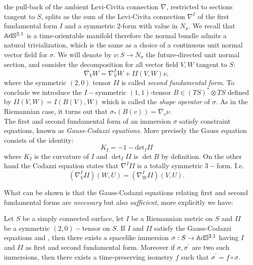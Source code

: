 the pull-back of the ambient Levi-Civita connection $\nabla$, restricted to sections tangent to $S$, splits as the sum of the Levi-Civita connection $\nabla^I$ of the first fundamental form $I$ and a symmetric 2-form with value in $N_\sigma$. We recall that $\mathbb{A}\mathrm{d}\mathbb{S}^{2,1}$ is a time-orientable manifold therefore the normal bundle admits a natural trivialization, which is the same as a choice of a continuous unit normal vector field for $\sigma.$ We will denote by $\nu:S\to N_\sigma$ the future-directed unit normal section, and consider the decomposition for all vector field $V,W$ tangent to $S$: 
\[
    \nabla_V W=\nabla^I_V W+II(V,W)\nu,
\]
where the symmetric $(2,0)$ tensor $II$ is called \textit{second fundamental form}. To conclude we introduce the $I-$symmetric $(1,1)$-tensor $B\in (TS)^*\otimes TS$ defined by $II(V,W)=I(B(V),W)$ which is called the \textit{shape operator} of $\sigma.$ As in the Riemannian case, it turns out that $\sigma_*(B(v))=\nabla_v\nu.$\\  
The first and second fundamental form of an immersion $\sigma$ satisfy constraint equations, known as \textit{Gauss-Codazzi equations}. More precisely the Gauss equation consists of the identity: 
\begin{equation}\label{Gauss}
    K_I=-1-\text{det}_I II
\end{equation}
where $K_I$ is the curvature of $I$ and $\det_I II$ is $\det B$ by definition. On the other hand the Codazzi equation states that $\nabla^III$ is a totally symmetric $3-$form. I.e. 
\begin{equation}\label{Codazzi}
    (\nabla_V^{I}II)(W,U)=(\nabla_W^I II)(V,U).  
\end{equation}

What can be shown is that the Gauss-Codazzi equations relating first and second fundamental forms are \textit{necessary} but also \textit{sufficient}, more explicitly we have:

\begin{theorem}\label{immcondition}
    Let $S$ be a simply connected surface, let $I$ be a Riemannian metric on $S$ and $II$  be a symmetric $(2,0)-$tensor on $S$. If $I$ and $II$ satisfy the Gauss-Codazzi equations  and , then there exists a spacelike immersion $\sigma:S\to\mathbb{A}\mathrm{d}\mathbb{S}^{2,1}$ having $I$ and $II$ as first and second fundamental form. Moreover if $\sigma,\sigma^{\prime}$ are two such immersions, then there exists a time-preserving isometry $f$ such that $\sigma^{\prime} =f\circ\sigma$.  
\end{theorem}

